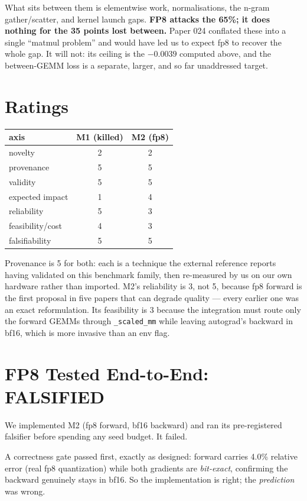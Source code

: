 \documentclass{article}
\begin{document}
What sits between them is elementwise work, normalisations, the n-gram gather/scatter, and kernel launch gaps. \textbf{FP8 attacks the 65\%; it does nothing for the 35 points lost between.} Paper 024 conflated these into a single ``matmul problem'' and would have led us to expect fp8 to recover the whole gap. It will not: its ceiling is the $-0.0039$ computed above, and the between-GEMM loss is a separate, larger, and so far unaddressed target.

\section{Ratings}
\begin{center}\begin{small}
\begin{tabular}{lcc}
\toprule
axis & M1 (killed) & M2 (fp8) \\
\midrule
novelty & 2 & 2 \\
provenance & 5 & 5 \\
validity & 5 & 5 \\
expected impact & 1 & 4 \\
reliability & 5 & 3 \\
feasibility/cost & 4 & 3 \\
falsifiability & 5 & 5 \\
\bottomrule
\end{tabular}
\end{small}\end{center}

Provenance is 5 for both: each is a technique the external reference reports having validated on this benchmark family, then re-measured by us on our own hardware rather than imported. M2's reliability is 3, not 5, because fp8 forward is the first proposal in five papers that can degrade quality --- every earlier one was an exact reformulation. Its feasibility is 3 because the integration must route only the forward GEMMs through \texttt{\_scaled\_mm} while leaving autograd's backward in bf16, which is more invasive than an env flag.

\section{FP8 Tested End-to-End: FALSIFIED}
\label{sec:fp8dead}
We implemented M2 (fp8 forward, bf16 backward) and ran its pre-registered falsifier before spending any seed budget. It failed.

A correctness gate passed first, exactly as designed: forward carries 4.0\% relative error (real fp8 quantization) while both gradients are \emph{bit-exact}, confirming the backward genuinely stays in bf16. So the implementation is right; the \emph{prediction} was wrong.
\end{document}
